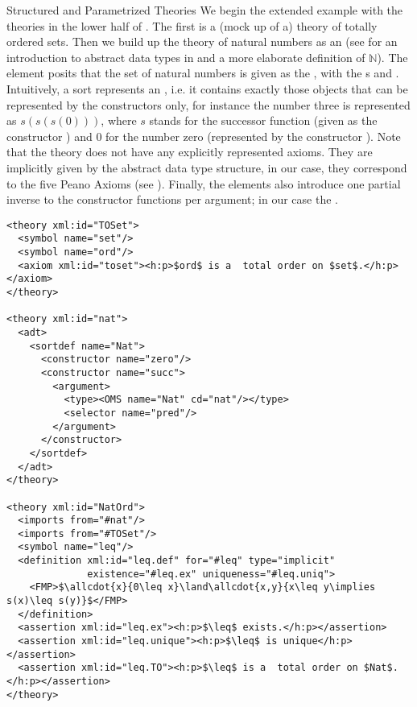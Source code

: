 \begin{omgroup}[id=natlist]{Structured and Parametrized Theories}
We begin the extended example with the theories in the lower half of
{}.  The first is a (mock up of a) theory of totally
ordered sets. Then we build up the theory of natural numbers as an
{} (see {} for an introduction to abstract
data types in {\omdoc} and a more elaborate definition of $\mathbb N$). The
{} element posits that the set of natural numbers is given as the
{} {}, with the {s} {}
and {}. Intuitively, a sort represents an {}, i.e. it contains exactly those objects that can be represented by the
constructors only, for instance the number three is represented as $s(s(s(0)))$, where $s$
stands for the successor function (given as the constructor {}) and $0$ for
the number zero (represented by the constructor {}). Note that the theory
{} does not have any explicitly represented axioms. They are implicitly given
by the abstract data type structure, in our case, they correspond to the five Peano Axioms
(see {}).  Finally, the {} elements also introduce one
partial inverse to the constructor functions per argument; in our case the
{}.
\begin{lstlisting}[mathescape,label=lst:nat-param,
  index={theory,symbol,definition,assertion}]
<theory xml:id="TOSet">                   
  <symbol name="set"/>
  <symbol name="ord"/>
  <axiom xml:id="toset"><h:p>$ord$ is a  total order on $set$.</h:p></axiom>
</theory>                               

<theory xml:id="nat">
  <adt>
    <sortdef name="Nat">
      <constructor name="zero"/>
      <constructor name="succ">
        <argument>
          <type><OMS name="Nat" cd="nat"/></type>
          <selector name="pred"/>
        </argument>
      </constructor>
    </sortdef>
  </adt>
</theory>

<theory xml:id="NatOrd">
  <imports from="#nat"/>
  <imports from="#TOSet"/>
  <symbol name="leq"/>
  <definition xml:id="leq.def" for="#leq" type="implicit" 
              existence="#leq.ex" uniqueness="#leq.uniq">
    <FMP>$\allcdot{x}{0\leq x}\land\allcdot{x,y}{x\leq y\implies s(x)\leq s(y)}$</FMP>
  </definition>
  <assertion xml:id="leq.ex"><h:p>$\leq$ exists.</h:p></assertion>
  <assertion xml:id="leq.unique"><h:p>$\leq$ is unique</h:p></assertion>
  <assertion xml:id="leq.TO"><h:p>$\leq$ is a  total order on $Nat$.</h:p></assertion>
</theory>                       
\end{lstlisting}


\end{omgroup}
